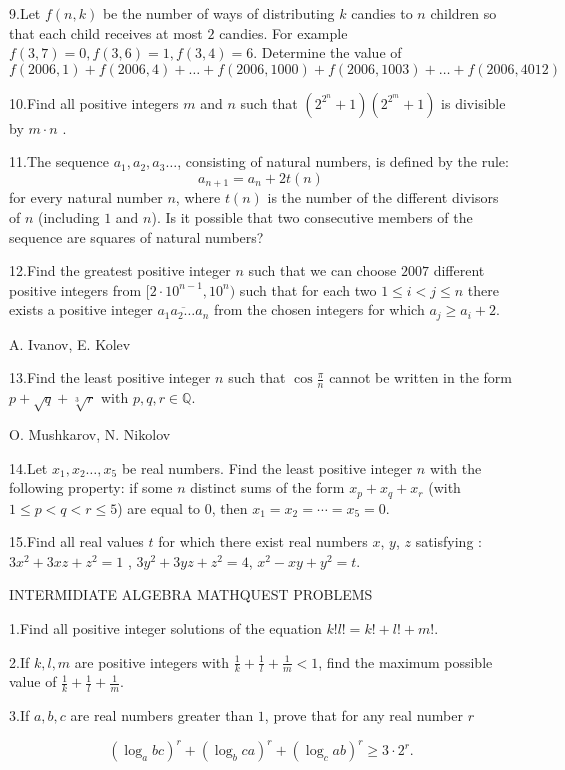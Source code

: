 \documentclass{article}
\begin{document}
9.Let $ f(n,k)$ be the number of ways of distributing $ k$ candies to $ n$ children so that each child receives at most $ 2$ candies. For example $ f(3,7) = 0,f(3,6) = 1,f(3,4) = 6$. Determine the value of $ f(2006,1) + f(2006,4) + \ldots + f(2006,1000) + f(2006,1003) + \ldots + f(2006,4012)$

10.Find all positive integers $m$ and $n$ such that $(2^{2^{n}}+1)(2^{2^{m}}+1) $ is divisible by $m\cdot n $ .

11.The sequence $a_1,a_2,a_3\ldots $, consisting of natural numbers, is defined by the rule:
\[a_{n+1}=a_{n}+2t(n)\] for every natural number $n$, where $t(n)$ is the number of the different divisors of $n$ (including $1$ and $n$). Is it possible that two consecutive members of the sequence are squares of natural numbers?

12.Find the greatest positive integer $n$ such that we can choose $2007$ different positive integers from $[2\cdot 10^{n-1},10^{n})$ such that for each two $1\leq i<j\leq n$ there exists a positive integer $\overline{a_{1}a_{2}\ldots a_{n}}$ from the chosen integers for which $a_{j}\geq a_{i}+2$.

A. Ivanov, E. Kolev

13.Find the least positive integer $n$ such that $\cos\frac{\pi}{n}$ cannot be written in the form $p+\sqrt{q}+\sqrt[3]{r}$ with $p,q,r\in\mathbb{Q}$.

O. Mushkarov, N. Nikolov

14.Let $x_1, x_2 \ldots , x_5$ be real numbers. Find the least positive integer $n$ with the following property: if some $n$ distinct sums of the form $x_p+x_q+x_r$ (with $1\le p<q<r\le 5$) are equal to $0$, then $x_1=x_2=\cdots=x_5=0$.	

15.Find all real values $t$ for which there exist real numbers $x$, $y$, $z$ satisfying :
$3x^2 + 3xz + z^2 = 1$ ,
$3y^2 + 3yz + z^2 = 4$,
$x^2 - xy + y^2 = t$.

INTERMIDIATE ALGEBRA MATHQUEST PROBLEMS

1.Find all positive integer solutions of the equation $k!l! = k!+l!+m!.$

2.If $k, l, m$ are positive integers with $\frac{1}{k}+\frac{1}{l}+\frac{1}{m}<1$, ﬁnd the maximum possible value of $\frac{1}{k}+\frac{1}{l}+\frac{1}{m}$.

3.If $a, b, c$ are real numbers greater than $1$, prove that for any real number $r$

\[(\log_{a}bc)^{r}+(\log_{b}ca)^{r}+(\log_{c}ab)^{r}\geq 3 \cdot 2^{r}. \]
\end{document}
